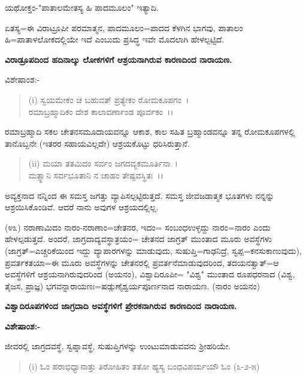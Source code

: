 ಯಥೋಕ್ತಂ-"ಪಾತಾಲಮೇತಸ್ಯ ಹಿ ಪಾದಮೂಲಂ" ಇತ್ಯಾದಿ.

ಏತಸ್ಯ=ಈ ವಿರಾಟ್ರೂಪೀ ಪರಮಾತ್ಮನ, ಪಾದಮೂಲಂ=ಪಾದದ ಕೆಳಗಿನ ಭಾಗವು, ಪಾತಾಲಂ ಹಿ=ಪಾತಾಳಲೋಕದಲ್ಲಿಯೇ ಇದೆ ಎಂಬುದು ಪ್ರಸಿದ್ಧ ಇವೇ ಮೊದಲಾಗಿ ಹೇಳಲ್ಪಟ್ಟಿದೆ.

\begin{center}
\textbf{ವಿರಾಡ್ರೂಪದಿಂದ ಹದಿನಾಲ್ಕು ಲೋಕಗಳಿಗೆ ಆಶ್ರಯನಾಗಿರುವ ಕಾರಣದಿಂದ ನಾರಾಯಣ.}
\end{center}

\noindent
ವಿಶೇಷಾಂಶ:-

\begin{verse}
(i) ಸ್ವಯಮೇಕಂ ಚ ಬಹುವತ್ ಪ್ರತ್ಯೇಕಂ ರೋಮಕೂಪಗಂ~।\\ ರಮಾಬ್ರಹ್ಮಾದಿಕಂ ದೇಶ ಕಾಲಾವರ್ಣಾಂಡ ಪೂರ್ವಕಂ~।।
\end{verse}


ರಮಾಬ್ರಹ್ಮಾದಿ ಸಕಲ ಚೇತನಸಮೂದಾಯವನ್ನೂ ಆಕಾಶ, ಕಾಲ ಸಹಿತ ಬ್ರಹ್ಮಾಂಡವನ್ನೂ ತನ್ನ ರೋಮಕೂಪಗಳಲ್ಲಿ ತಾನೊಬ್ಬನೇ (ಇತರರ ಸಹಾಯವಿಲ್ಲದೇ) ಆಶ್ರಯಕೊಟ್ಟು ಧರಿಸಿರುತ್ತಾನೆ.

\begin{verse}
(ii) ಮಯಾ ತತಮಿದಂ ಸರ್ವಂ ಜಗದವ್ಯಕಮೂರ್ತಿನಾ~।\\ ಮತ್ಸ್ಥಾನಿ ಸರ್ವಭೂತಾನಿ ನ ಚಾಹಂ ತೇಷ್ಟವಸ್ಥಿತಃ~।।
\end{verse}

ಅವ್ಯಕ್ತನಾದ ನನ್ನಿಂದ ಈ ಸಮಸ್ತ ಜಗತ್ತು ವ್ಯಾಪಿಸಲ್ಪಟ್ಟಿರುತ್ತದೆ. ಸಮಸ್ತ ಜೀವಜಡಾತ್ಮಕ ಭೂತಗಳು ನನ್ನನ್ನು ಆಶ್ರಯಿಸಿಕೊಂಡಿವೆ. ಆದರೆ ನಾನು ಅವುಗಳ ಆಶ್ರಯದಲ್ಲಿಲ್ಲ.

(೪೩) ನರಾಣಾಮಿದಂ ನಾರಂ-ನರಾಣಾಂ=ಚೇತನರ, ಇದಂ= ಸಂಬಂಧಉಳ್ಳದ್ದು ನಾರಂ=ನಾರಂ ಎಂದು ಹೇಳಲ್ಪಡುತ್ತದೆ. ಅಂದರೆ, ಜಾಗ್ರದಾದ್ಯವಸ್ಥಾತ್ರಯಂ= ಚೇತನದ ಜಾಗ್ರತ್ ಮುಂತಾದ ಮೂರು ಅವಸ್ಥೆಗಳು (ಜಾಗ್ರತ್=ಎಚ್ಚರಿಕೆಯಿಂದ ಇದ್ದು ವ್ಯಾಪಾರಗಳನ್ನು ಮಾಡುವುದು, ಸುಷುಪ್ತಿ=ಗಾಢನಿದ್ರೆ, ಸ್ವಪ್ಪ=ಕನಸುಕಾಣುವುದು), ಪ್ರವರ್ತಕತಯಾ=ಈ ಮೂರು ಅವಸ್ಥೆಗಳನ್ನು ಚೇತನರಲ್ಲಿ ಪ್ರವರ್ತನೆಮಾಡುವುದರಿಂದ, ತದಯನತ್ವಾತ್=ಆ ಅವಸ್ಥೆಗಳಿಗೆ ಆಶ್ರಯನಾಗಿರುವುದರಿಂದ (ಅಯನಂ), ವಿಶ್ವಾದಿರೂಪೀ= "ವಿಶ್ವ" ಮುಂತಾದ ರೂಪಧರನಾದ (ವಿಶ್ವ, ತೈಜಸ, ಪ್ರಾಜ್ಞ) ಭಗವನ್ನಾರಾಯಣಃ=ಷಡ್ಗುಣೈಶ್ವರ್ಯಪೂರ್ಣನಾದ ನಾರಾಯಣ. (ನಾರಂ ಅಯನಂ)

\begin{center}
\textbf{ವಿಶ್ವಾದಿರೂಪಗಳಿಂದ ಜಾಗ್ರದಾದಿ ಅವಸ್ಥೆಗಳಿಗೆ ಪ್ರೇರಕನಾಗಿರುವ ಕಾರಣದಿಂದ ನಾರಾಯಣ.}
\end{center}

\noindent
\textbf{ವಿಶೇಷಾಂಶ:-}

ಜೀವರಲ್ಲಿ ಜಾಗ್ರದವಸ್ಥೆ, ಸ್ವಪ್ನಾವಸ್ಥೆ, ಸುಷುಪ್ತಿಗಳನ್ನು ಉಂಟುಮಾಡುವವನು ಶ‍್ರೀಹರಿಯೇ.

\begin{verse}
(i) ಓಂ ಪರಾಭಿಧ್ಯಾನಾತ್ತು ತಿರೋಹಿತಂ ತತೋ ಹ್ಯಸ್ಯ ಬಂಧವಿಪರ್ಯಯೌ ಓಂ (೩-೨-೫)
\end{verse}

